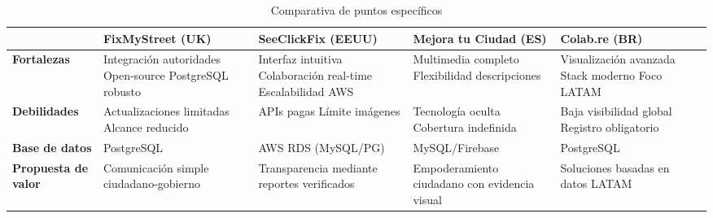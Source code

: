 \begin{table}[H]
\centering
\begin{tabular}{|>{\centering\arraybackslash}m{2.7cm}|>{\centering\arraybackslash}m{3cm}|>{\centering\arraybackslash}m{3cm}|>{\centering\arraybackslash}m{3cm}|>{\centering\arraybackslash}m{3cm}|>{\centering\arraybackslash}m{3cm}|}
\hline
\textbf{} & \textbf{FixMyStreet (UK)} & \textbf{SeeClickFix (EEUU)} & \textbf{Mejora tu Ciudad (ES)} & \textbf{Colab.re (BR)} \\ \hline

\textbf{Fortalezas} & 
Integración autoridades \newline Open-source \newline PostgreSQL robusto & 
Interfaz intuitiva \newline Colaboración real-time \newline Escalabilidad AWS & 
Multimedia completo \newline Flexibilidad descripciones & 
Visualización avanzada \newline Stack moderno \newline Foco LATAM \\ \hline

\textbf{Debilidades} & 
Actualizaciones limitadas \newline Alcance reducido & 
APIs pagas \newline Límite imágenes & 
Tecnología oculta \newline Cobertura indefinida & 
Baja visibilidad global \newline Registro obligatorio \\ \hline

\textbf{Base de datos} & 
PostgreSQL & 
AWS RDS \newline(MySQL/PG) & 
MySQL/Firebase & 
PostgreSQL \\ \hline

\textbf{Propuesta de valor} & 
Comunicación simple \newline ciudadano-gobierno & 
Transparencia mediante \newline reportes verificados & 
Empoderamiento ciudadano \newline con evidencia visual & 
Soluciones basadas \newline en datos LATAM \\ \hline

\end{tabular}
\caption{Comparativa de puntos específicos}
\label{tab:comparativa-optimizada}
\end{table}


